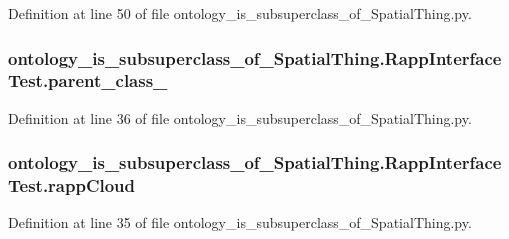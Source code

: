 Definition at line 50 of file ontology\-\_\-is\-\_\-subsuperclass\-\_\-of\-\_\-\-Spatial\-Thing.\-py.

\hypertarget{classontology__is__subsuperclass__of__SpatialThing_1_1RappInterfaceTest_a6ea2236e6eff4d4f75e45a48e636b567}{
\subsubsection[{parent\-\_\-class\-\_\-}]{\setlength{\rightskip}{0pt plus 5cm}ontology\-\_\-is\-\_\-subsuperclass\-\_\-of\-\_\-\-Spatial\-Thing.\-Rapp\-Interface\-Test.\-parent\-\_\-class\-\_\-}}\label{classontology__is__subsuperclass__of__SpatialThing_1_1RappInterfaceTest_a6ea2236e6eff4d4f75e45a48e636b567}


Definition at line 36 of file ontology\-\_\-is\-\_\-subsuperclass\-\_\-of\-\_\-\-Spatial\-Thing.\-py.

\hypertarget{classontology__is__subsuperclass__of__SpatialThing_1_1RappInterfaceTest_ac3419615d9c570bbbf77bf80d3f9425b}{
\subsubsection[{rapp\-Cloud}]{\setlength{\rightskip}{0pt plus 5cm}ontology\-\_\-is\-\_\-subsuperclass\-\_\-of\-\_\-\-Spatial\-Thing.\-Rapp\-Interface\-Test.\-rapp\-Cloud}}\label{classontology__is__subsuperclass__of__SpatialThing_1_1RappInterfaceTest_ac3419615d9c570bbbf77bf80d3f9425b}


Definition at line 35 of file ontology\-\_\-is\-\_\-subsuperclass\-\_\-of\-\_\-\-Spatial\-Thing.\-py.

